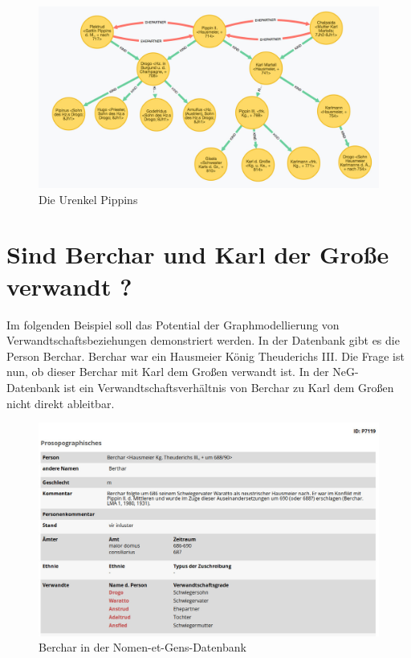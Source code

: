 \documentclass[ngerman,]{scrreprt}
\begin{document}
\begin{figure}
\centering
\includegraphics{Bilder/NeG/030-Urenkel-Pippins.jpg}
\caption{Die Urenkel Pippins}
\end{figure}

\section{Sind Berchar und Karl der Große verwandt ?}\label{sind-berchar-und-karl-der-grouxdfe-verwandt}

Im folgenden Beispiel soll das Potential der Graphmodellierung von Verwandtschaftsbeziehungen demonstriert werden. In der Datenbank gibt es die Person Berchar. Berchar war ein Hausmeier König Theuderichs III. Die Frage ist nun, ob dieser Berchar mit Karl dem Großen verwandt ist. In der NeG-Datenbank ist ein Verwandtschaftsverhältnis von Berchar zu Karl dem Großen nicht direkt ableitbar.

\begin{figure}
\centering
\includegraphics{Bilder/NeG/040-Berchar-DB-Eintrag.jpg}
\caption{Berchar in der Nomen-et-Gens-Datenbank}
\end{figure}
\end{document}
